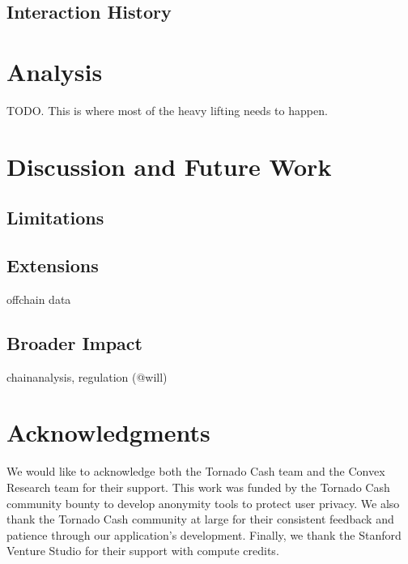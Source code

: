 \documentclass[11pt,a4paper]{article}
\begin{document}
\subsection{Interaction History}

\section{Analysis}

TODO. This is where most of the heavy lifting needs to happen.

\section{Discussion and Future Work}

\subsection{Limitations}



\subsection{Extensions}

offchain data

\subsection{Broader Impact}

chainanalysis, regulation (@will)

\section*{Acknowledgments}
We would like to acknowledge both the Tornado Cash team and the Convex Research team for their support. This work was funded by the Tornado Cash community bounty to develop anonymity tools to protect user privacy. We also thank the Tornado Cash community at large for their consistent feedback and patience through our application's development. Finally, we thank the Stanford Venture Studio for their support with compute credits.



\end{document}
